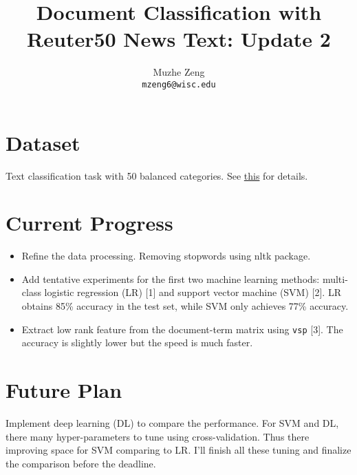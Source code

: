 \documentclass{article}
\title{Document Classification with Reuter50 News Text: Update 2}
\author{
Muzhe Zeng\\
\texttt{mzeng6@wisc.edu} 
}
\begin{document}


\maketitle


\section{Dataset}
Text classification task with 50 balanced categories. See \href{https://archive.ics.uci.edu/ml/datasets/Reuter_50_50}{this} for details. 


\section{Current Progress}

\begin{itemize}
\item Refine the data processing. Removing stopwords using nltk package.
\item Add tentative experiments for the first two machine learning methods: multi-class logistic regression (LR) [1] and support vector machine (SVM) [2]. LR obtains 85\% accuracy in the test set, while SVM only achieves 77\% accuracy.
\item Extract low rank feature from the document-term matrix using \texttt{vsp} [3]. The accuracy is slightly lower but the speed is much faster. 
\end{itemize}


\section{Future Plan}

Implement deep learning (DL) to compare the performance. For SVM and DL, there many hyper-parameters to tune using cross-validation. Thus there improving space for SVM comparing to LR. I'll finish all these tuning and finalize the comparison before the deadline. 
\end{document}
